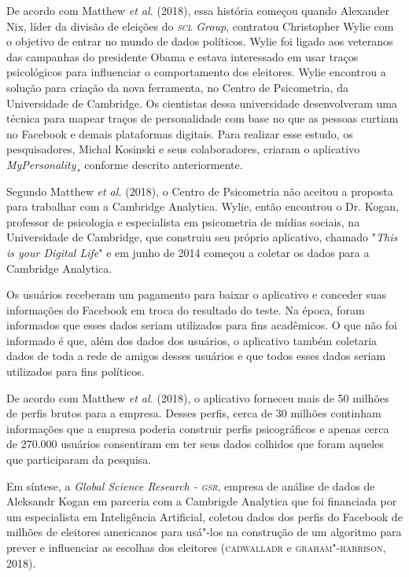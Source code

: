 De acordo com Matthew \emph{et al.} (2018), essa história começou quando
Alexander Nix, líder da divisão de eleições do \emph{\textsc{scl} Group},
contratou Christopher Wylie com o objetivo de entrar no mundo de dados
políticos. Wylie foi ligado aos veteranos das campanhas do presidente
Obama e estava interessado em usar traços psicológicos para influenciar
o comportamento dos eleitores. Wylie encontrou a solução para criação da
nova ferramenta, no Centro de Psicometria, da Universidade de Cambridge.
Os cientistas dessa universidade desenvolveram uma técnica para mapear
traços de personalidade com base no que as pessoas curtiam no Facebook e
demais plataformas digitais. Para realizar esse estudo, os
pesquisadores, Michal Kosinski e seus colaboradores, criaram o
aplicativo \emph{MyPersonality}¸ conforme descrito anteriormente.

Segundo Matthew \emph{et al.} (2018), o Centro de Psicometria não aceitou a
proposta para trabalhar com a Cambridge Analytica. Wylie, então
encontrou o Dr. Kogan, professor de psicologia e especialista em
psicometria de mídias sociais, na Universidade de Cambridge, que
construiu seu próprio aplicativo, chamado "\emph{This is your Digital
Life}" e em junho de 2014 começou a coletar os dados para a Cambridge
Analytica.

Os usuários receberam um pagamento para baixar o aplicativo e conceder
suas informações do Facebook em troca do resultado do teste. Na época,
foram informados que esses dados seriam utilizados para fins acadêmicos.
O que não foi informado é que, além dos dados dos usuários, o aplicativo
também coletaria dados de toda a rede de amigos desses usuários e que
todos esses dados seriam utilizados para fins políticos.

De acordo com Matthew \emph{et al.} (2018), o aplicativo forneceu mais de 50
milhões de perfis brutos para a empresa. Desses perfis, cerca de 30
milhões continham informações que a empresa poderia construir perfis
psicográficos e apenas cerca de 270.000 usuários consentiram em ter seus
dados colhidos que foram aqueles que participaram da pesquisa.

Em síntese, a \emph{Global Science Research - \textsc{gsr}}, empresa de análise
de dados de Aleksandr Kogan em parceria com a Cambrigde Analytica que
foi financiada por um especialista em Inteligência Artificial, coletou
dados dos perfis do Facebook de milhões de eleitores americanos para
usá"-los na construção de um algoritmo para prever e influenciar as
escolhas dos eleitores (\textsc{cadwalladr} e \textsc{graham"-harrison}, 2018).

